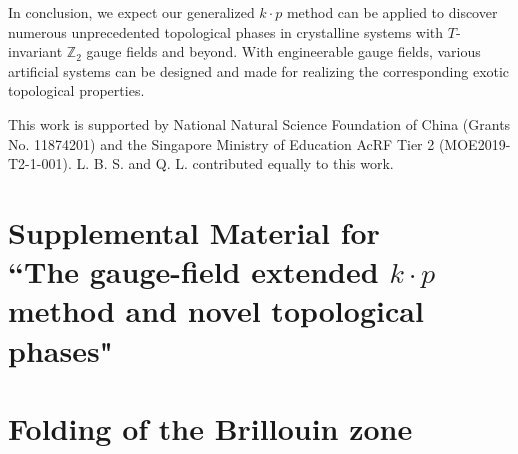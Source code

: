 \documentclass[aps,prl,twocolumn,noshowpacs,superscriptaddress]{revtex4-1}
\def \Z {\mathbb{Z}}
\begin{document}
In conclusion, we expect our generalized $k\cdot p$ method can be applied to discover numerous unprecedented topological phases in crystalline systems with $T$-invariant $\Z_2$ gauge fields and beyond. With engineerable gauge fields, various artificial systems can be designed and made for realizing the corresponding exotic topological properties.




\begin{acknowledgements}
This work is supported by National Natural Science Foundation of China (Grants No. 11874201) and the Singapore Ministry of Education AcRF Tier 2 (MOE2019-T2-1-001). L. B. S. and Q. L. contributed equally to this work.
\end{acknowledgements}








\newpage

\onecolumngrid
\renewcommand{\theequation}{S\arabic{equation}}
\setcounter{equation}{0}
\renewcommand{\thefigure}{S\arabic{figure}}
\setcounter{figure}{0}




\section{Supplemental Material for \\ ``The gauge-field extended $k\cdot p$ method and novel topological phases"}




\section{Folding of the Brillouin zone}
\end{document}
